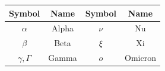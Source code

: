 \begin{center}
\small
\begin{tabular}{|c|c|c|c|}
  \hline
  Symbol & Name & Symbol & Name \\ \hline
  $\alpha$ & Alpha & $\nu$ & Nu \\
  $\beta$ & Beta & $\xi$ & Xi \\
  $\gamma,\Gamma$ & Gamma & $o$ & Omicron \\
  \hline
\end{tabular}
\end{center}



